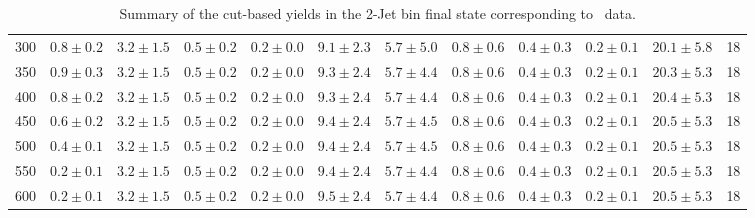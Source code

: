 \begin{table}
{\begin{center}
\begin{tabular}{l c c c c c c c c c c c }
300 & $0.8\pm0.2$ & $3.2\pm1.5$ & $0.5\pm0.2$ & $0.2\pm0.0$ & $9.1\pm2.3$ & $5.7\pm5.0$ & $0.8\pm0.6$ & $0.4\pm0.3$ & $0.2\pm0.1$ & $20.1\pm5.8$ & 18 \\
350 & $0.9\pm0.3$ & $3.2\pm1.5$ & $0.5\pm0.2$ & $0.2\pm0.0$ & $9.3\pm2.4$ & $5.7\pm4.4$ & $0.8\pm0.6$ & $0.4\pm0.3$ & $0.2\pm0.1$ & $20.3\pm5.3$ & 18 \\
400 & $0.8\pm0.2$ & $3.2\pm1.5$ & $0.5\pm0.2$ & $0.2\pm0.0$ & $9.3\pm2.4$ & $5.7\pm4.4$ & $0.8\pm0.6$ & $0.4\pm0.3$ & $0.2\pm0.1$ & $20.4\pm5.3$ & 18 \\
450 & $0.6\pm0.2$ & $3.2\pm1.5$ & $0.5\pm0.2$ & $0.2\pm0.0$ & $9.4\pm2.4$ & $5.7\pm4.5$ & $0.8\pm0.6$ & $0.4\pm0.3$ & $0.2\pm0.1$ & $20.5\pm5.3$ & 18 \\
500 & $0.4\pm0.1$ & $3.2\pm1.5$ & $0.5\pm0.2$ & $0.2\pm0.0$ & $9.4\pm2.4$ & $5.7\pm4.5$ & $0.8\pm0.6$ & $0.4\pm0.3$ & $0.2\pm0.1$ & $20.5\pm5.3$ & 18 \\
550 & $0.2\pm0.1$ & $3.2\pm1.5$ & $0.5\pm0.2$ & $0.2\pm0.0$ & $9.4\pm2.4$ & $5.7\pm4.4$ & $0.8\pm0.6$ & $0.4\pm0.3$ & $0.2\pm0.1$ & $20.5\pm5.3$ & 18 \\
600 & $0.2\pm0.1$ & $3.2\pm1.5$ & $0.5\pm0.2$ & $0.2\pm0.0$ & $9.5\pm2.4$ & $5.7\pm4.4$ & $0.8\pm0.6$ & $0.4\pm0.3$ & $0.2\pm0.1$ & $20.5\pm5.3$ & 18 \\
\hline
\end{tabular}
\end{center}
}
\caption{Summary of the cut-based yields in the 2-Jet bin final state corresponding to \intlumi\ data.}
\end{table}